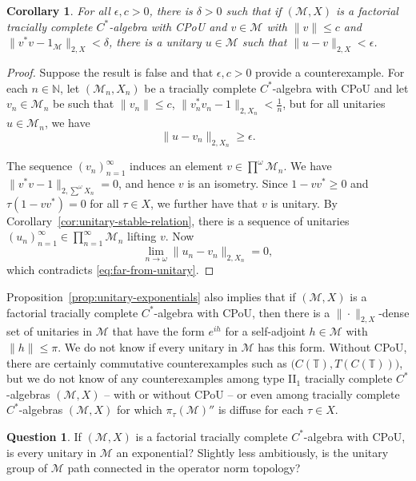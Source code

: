 \documentclass[a4paper,11pt]{amsart}
\newtheorem{corollary}[theorem]{Corollary}
\theoremstyle{definition}
\newtheorem{question}[theorem]{Question}
\numberwithin{equation}{section}
\numberwithin{theorem}{section}
\newcommand{\M}{\mathcal{M}}
\begin{document}
\begin{corollary}
	For all $\epsilon, c > 0$, there is $\delta > 0$ such that if $(\M, X)$ is a factorial tracially complete $C^*$-algebra with CPoU and $v \in \M$ with $\|v\| \leq c$ and $\|v^* v - 1_\mathcal M\|_{2, X} < \delta$, there is a unitary $u \in \M$ such that $\|u - v\|_{2, X} < \epsilon$.
\end{corollary}

\begin{proof}
	Suppose the result is false and that $\epsilon, c > 0$ provide a counterexample.  For each $n \in \mathbb N$, let $(\M_n, X_n)$ be a tracially complete $C^*$-algebra with CPoU and let $v_n \in \M_n$ be such that $\|v_n\| \leq c$, $\|v_n^* v_n - 1\|_{2, X_n} < \frac1n$, but for all unitaries $u \in \M_n$, we have
	\begin{equation}\label{eq:far-from-unitary}
		\|u - v_n\|_{2, X_n} \geq \epsilon.
	\end{equation}
	
	The sequence $(v_n)_{n=1}^\infty$ induces an element $v \in \prod^\omega \M_n$.  We have $\|v^*v - 1\|_{2, \sum^\omega X_n} = 0$, and hence $v$ is an isometry.  Since $1 -vv^* \geq 0$ and $\tau(1 - vv^*) = 0$ for all $\tau \in X$, we further have that $v$ is unitary.  By Corollary~\ref{cor:unitary-stable-relation}, there is a sequence of unitaries $(u_n)_{n=1}^\infty \in \prod_{n=1}^\infty \M_n$ lifting $v$.  Now
	\begin{equation}
		\lim_{n \rightarrow \omega} \|u_n - v_n \|_{2, X_n} = 0,
	\end{equation}
	which contradicts \eqref{eq:far-from-unitary}.
\end{proof}	


Proposition~\ref{prop:unitary-exponentials} also implies that if $(\M, X)$ is a factorial tracially complete $C^*$-algebra with CPoU, then there is a $\|\cdot\|_{2, X}$-dense set of unitaries in $\M$ that have the form $e^{ih}$ for a self-adjoint $h \in \M$ with $\|h\| \leq \pi$.  We do not know if every unitary in $\M$ has this form.  Without CPoU, there are certainly commutative counterexamples such as $\big(C(\mathbb T), T(C(\mathbb T))\big)$, but we do not know of any counterexamples among type II$_1$ tracially complete $C^*$-algebras $(\M, X)$ -- with or without CPoU -- or even among tracially complete $C^*$-algebras $(\M,X)$ for which $\pi_\tau(\M)''$ is diffuse for each $\tau\in X$.

\begin{question}\label{question:unitary-exponentials}
	If $(\M, X)$ is a factorial tracially complete $C^*$-algebra with CPoU, is every unitary in $\M$ an exponential?  Slightly less ambitiously, is the unitary group of $\M$ path connected in the operator norm topology?
\end{question}
\end{document}
